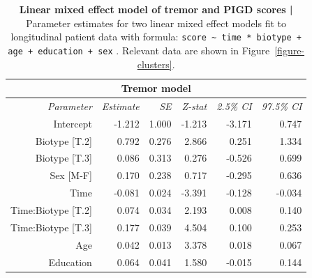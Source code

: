 \documentclass[12pt,aps,pra,reprint,showkeys]{revtex4-1}
\begin{document}
\begin{table}[p]
    \caption{
      \textbf{Linear mixed effect model of tremor and PIGD scores | }
      Parameter estimates for two linear mixed effect models fit to longitudinal patient data with formula: \texttt{score \textasciitilde{} time * biotype + age + education + sex} \citep{statsmodels}.
      Relevant data are shown in Figure~\ref{figure-clusters}.
    }
    \label{supp-table-lme}
    \setlength{\tabcolsep}{10pt}
    \renewcommand{\arraystretch}{1.1}
    \begin{center}
      \begin{tabular}{r r r r r r}
                                                                                                                              \toprule
                                                                                 \multicolumn{6}{c}{\textbf{Tremor model}} \\ \toprule
           \textit{Parameter} & \textit{Estimate} & \textit{SE} & \textit{Z-stat} & \textit{2.5\% CI} & \textit{97.5\% CI} \\ \midrule
                    Intercept &            -1.212 &       1.000 &          -1.213 &            -3.171 &              0.747 \\
                Biotype [T.2] &             0.792 &       0.276 &           2.866 &             0.251 &              1.334 \\ 
                Biotype [T.3] &             0.086 &       0.313 &           0.276 &            -0.526 &              0.699 \\
                    Sex [M-F] &             0.170 &       0.238 &           0.717 &            -0.295 &              0.636 \\
                         Time &            -0.081 &       0.024 &          -3.391 &            -0.128 &             -0.034 \\
           Time:Biotype [T.2] &             0.074 &       0.034 &           2.193 &             0.008 &              0.140 \\
           Time:Biotype [T.3] &             0.177 &       0.039 &           4.504 &             0.100 &              0.253 \\
                          Age &             0.042 &       0.013 &           3.378 &             0.018 &              0.067 \\
                    Education &             0.064 &       0.041 &           1.580 &            -0.015 &              0.144 \\ 

\end{tabular}
\end{center}
\end{table}
\end{document}
